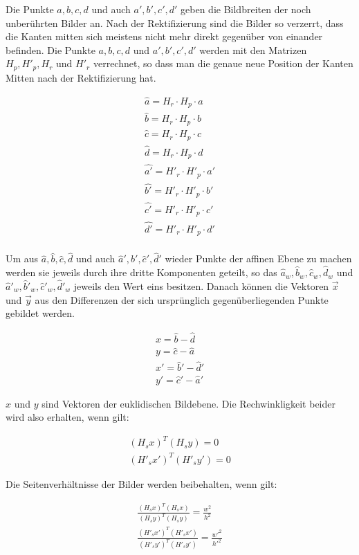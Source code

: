 Die Punkte $a,b,c,d$ und auch $a',b',c',d'$ geben die Bildbreiten der noch unberührten Bilder an. Nach der Rektifizierung sind die Bilder so verzerrt, dass die Kanten mitten sich meistens nicht mehr direkt gegenüber von einander befinden. Die Punkte $a,b,c,d$ und $a',b',c',d'$ werden mit den Matrizen $H_p, H'_p, H_r$ und $H'_r$ verrechnet, so dass man die genaue neue Position der Kanten Mitten nach der Rektifizierung hat. 

\begin{gather*}
	\hat{a} = H_r\cdot H_p \cdot a\\
	\hat{b} = H_r\cdot H_p \cdot b\\
	\hat{c} = H_r\cdot H_p \cdot c\\
	\hat{d} = H_r\cdot H_p \cdot d\\
	\hat{a'} = H'_r\cdot H'_p \cdot a'\\
	\hat{b'} = H'_r\cdot H'_p \cdot b'\\
	\hat{c'} = H'_r\cdot H'_p \cdot c'\\
	\hat{d'} = H'_r\cdot H'_p \cdot d'\\
\end{gather*}

Um aus $\hat{a},\hat{b},\hat{c},\hat{d}$ und auch $\hat{a}',\hat{b}',\hat{c}',\hat{d}'$ wieder Punkte der affinen Ebene zu machen werden sie jeweils durch ihre dritte Komponenten geteilt, so das $\hat{a}_w,\hat{b}_w,\hat{c}_w,\hat{d}_w$ und $\hat{a}'_w,\hat{b}'_w,\hat{c}'_w,\hat{d}'_w$ jeweils den Wert eins besitzen. Danach können die Vektoren $\vec{x}$ und $\vec{y}$ aus den Differenzen der sich ursprünglich gegenüberliegenden Punkte gebildet werden.

\begin{gather}
	x = \hat{b}-\hat{d}\\
	y = \hat{c}-\hat{a}\\
	x' = \hat{b}'-\hat{d}'\\
	y' = \hat{c}'-\hat{a}'
\end{gather}

$x$ und $y$ sind Vektoren der euklidischen Bildebene. Die Rechwinkligkeit beider wird also erhalten, wenn gilt:

\begin{gather}
	(H_sx)^T(H_sy)= 0 \\
	(H'_sx')^T(H'_sy')= 0 
\end{gather}

Die Seitenverhältnisse der Bilder werden beibehalten, wenn gilt:

\begin{gather}
	\frac{(H_sx)^T(H_sx)}{(H_sy)^T(H_sy)} = \frac{w^2}{h^2}\\
	\frac{(H'_sx')^T(H'_sx')}{(H'_sy')^T(H'_sy')} = \frac{w'^2}{h'^2}	
\end{gather}

